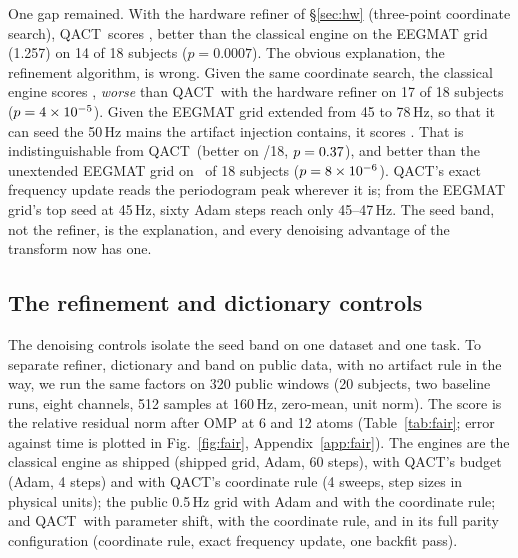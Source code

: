 \documentclass{article}
\newcommand{\qact}{QACT}
\begin{document}
One gap remained. With the hardware refiner of \S\ref{sec:hw} (three-point coordinate search), \qact\ scores \denoiseRefQ, better than the classical engine on the EEGMAT grid (1.257) on 14 of 18 subjects ($p=0.0007$). The obvious explanation, the refinement algorithm, is wrong. Given the same coordinate search, the classical engine scores \denoiseArmAScore, \emph{worse} than \qact\ with the hardware refiner on 17 of 18 subjects ($p=4\times10^{-5}$). Given the EEGMAT grid extended from 45 to 78\,Hz, so that it can seed the 50\,Hz mains the artifact injection contains, it scores \denoiseArmBScore. That is indistinguishable from \qact\ (better on \denoiseArmBVsQBetter/18, $p=0.37$), and better than the unextended EEGMAT grid on \denoiseArmBVsCBetter\ of 18 subjects ($p=8\times10^{-6}$). \qact's exact frequency update reads the periodogram peak wherever it is; from the EEGMAT grid's top seed at 45\,Hz, sixty Adam steps reach only 45--47\,Hz. The seed band, not the refiner, is the explanation, and every denoising advantage of the transform now has one.

\subsection{The refinement and dictionary controls}
\label{sec:control}
The denoising controls isolate the seed band on one dataset and one task. To separate refiner, dictionary and band on public data, with no artifact rule in the way, we run the same factors on 320 public windows (20 subjects, two baseline runs, eight channels, 512 samples at 160\,Hz, zero-mean, unit norm). The score is the relative residual norm after OMP at 6 and 12 atoms (Table~\ref{tab:fair}; error against time is plotted in Fig.~\ref{fig:fair}, Appendix~\ref{app:fair}). The engines are the classical engine as shipped (shipped grid, Adam, 60 steps), with \qact's budget (Adam, 4 steps) and with \qact's coordinate rule (4 sweeps, step sizes in physical units); the public 0.5\,Hz grid with Adam and with the coordinate rule; and \qact\ with parameter shift, with the coordinate rule, and in its full parity configuration (coordinate rule, exact frequency update, one backfit pass).
\end{document}
